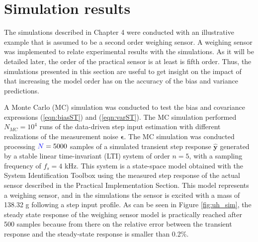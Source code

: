 \section{Simulation results} 

\color{blue} 
The simulations described in Chapter 4 were conducted with an illustrative example that is assumed to be a second order weighing sensor.
A weighing sensor was implemented to relate experimental results with the simulations. 
As it will be detailed later, the order of the practical sensor is at least is fifth order. 
Thus, the simulations presented in this section are useful to get insight on the impact of that increasing the model order has on the accuracy of the bias and variance predictions.    
\color{black}


A Monte Carlo (MC) simulation was conducted to test the bias and covariance expressions (\ref{eqn:biasST}) and (\ref{eqn:varST}).
The MC simulation performed $N_{MC} = 10^4$ runs of the data-driven step input estimation with different realizations of the measurement noise $\bm{\epsilon}$.
The MC simulation was conducted processing $\color{blue}N\color{black} = 5000$ samples of a simulated transient step response $\widehat{\mathbf{y}}$ generated by a stable linear time-invariant (LTI) system of order $n = 5$, with a sampling frequency of $f_s=4$ kHz.
This system is a state-space model obtained with the System Identification Toolbox using the measured step response of the actual sensor described in the Practical Implementation Section.
This model represents a weighing sensor, and in the simulations the sensor is excited with a mass of 138.32 g following a step input profile. 
As can be seen in Figure \ref{fig:uh_sim}, the steady state response of the weighing sensor model is practically reached after 500 samples because from there on the relative error between the transient response and the steady-state response is smaller than 0.2\%.

